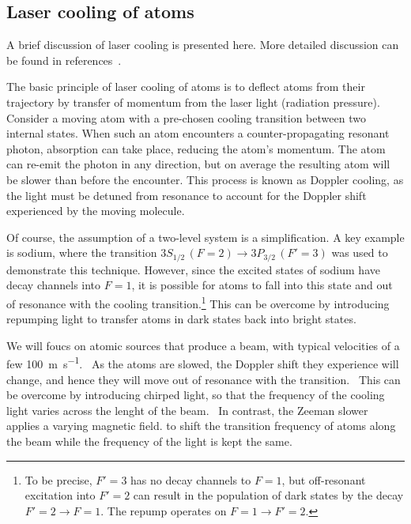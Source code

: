 
\subsection{Laser cooling of atoms}

A brief discussion of laser cooling is presented here. More detailed discussion
can be found in references~\cite{Metcalf1999,RevModPhys.70.721,McCarron_2018}.

The basic principle of laser cooling of atoms is to deflect atoms from their
trajectory by transfer of momentum from the laser light (radiation
pressure).~\cite{RevModPhys.70.721} Consider a moving atom with a
pre-chosen cooling transition between two internal states.  When such an atom
encounters a counter-propagating resonant photon, absorption can take place,
reducing the atom's momentum. The atom can re-emit the photon in any direction,
but on average the resulting atom will be slower than before the encounter.
This process is known as Doppler cooling, as the light must be detuned from
resonance to account for the Doppler shift experienced by the moving
molecule.~\cite{Metcalf1999}

Of course, the assumption of a two-level system is a simplification. A key
example is sodium, where the transition $3S_{1/2}\, (F=2) \rightarrow 3P_{3/2}\,
(F'=3)$ was used to demonstrate this technique. However, since the excited
states of sodium have decay channels into $F=1$, it is possible for atoms to
fall into this state and out of resonance with the cooling
transition.\footnote{To be precise, $F'=3$ has no decay channels to $F=1$, but
off-resonant excitation into $F'=2$ can result in the population of dark states
by the decay $F'=2 \rightarrow F=1$. The repump operates on $F=1\rightarrow
F'=2$.} This can be overcome by introducing repumping light to transfer atoms in
dark states back into bright states.~\cite{RevModPhys.70.721} 

We will foucs on atomic sources that produce a beam, with typical velocities of
a few \SI{100}{\metre\per\second}.~\cite{Metcalf1999}  As the atoms are slowed,
the Doppler shift they experience will change, and hence they will move out of
resonance with the transition.~\cite{RevModPhys.70.721} This can be overcome by
introducing chirped light, so that the frequency of the cooling light varies
across the lenght of the beam.~\cite{Prodan1984} In contrast, the Zeeman slower
applies a varying magnetic field. to shift the transition frequency of atoms
along the beam while the frequency of the light is kept the same.


